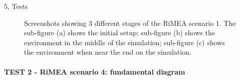 \documentclass[10pt,a4paper]{article}
\begin{document}
\begin{task}{5, Tests}
\begin{figure}[H]
    \centering
    \hfill
    \hfill
    \caption{Screenshots showing 3 different stages of the RiMEA scenario 1. The sub-figure (a) shows the initial setup; sub-figure (b) shows the environment in the middle of the simulation; sub-figure (c) shows the environment when near the end on the simulation.}
    \label{fig:rimea1}
\end{figure}
\pagebreak
\paragraph{TEST 2 - RiMEA scenario 4: fundamental diagram}\\


\end{task}
\end{document}
